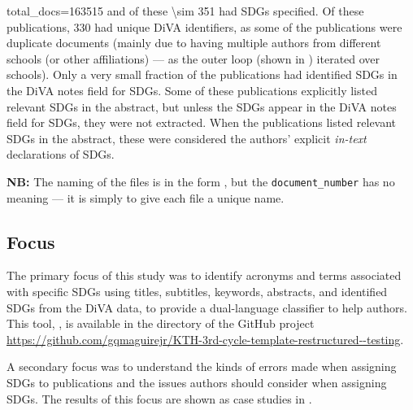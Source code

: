 \begin{takeaway}
total\_docs=\num{163515} and of these \num{\sim 351} had \glspl{SDG} specified. Of these publications, \num{330} had unique \gls{DiVA} identifiers, as some of the publications were duplicate documents (mainly due to having multiple authors from different schools (or other affiliations) --- as the outer loop (shown in ) iterated over schools). Only a very small fraction of the publications had identified \glspl{SDG} in the \gls{DiVA} notes field for \glspl{SDG}. Some of these publications explicitly listed relevant \glspl{SDG} in the abstract, but unless the \glspl{SDG} appear in the \gls{DiVA} notes field for \glspl{SDG}, they were not extracted. When the publications listed relevant \glspl{SDG} in the abstract, these were considered the authors' explicit \textit{in-text} declarations of \glspl{SDG}.
\end{takeaway}

\textbf{NB:} The naming of the files is in the form , but the \texttt{document\_number} has no meaning --- it is simply to give each file a unique name.

\subsection{Focus}
\label{sec:focus}

The primary focus of this study was to identify acronyms and terms associated with specific \glspl{SDG} using titles, subtitles, keywords, abstracts, and identified \glspl{SDG} from the \gls{DiVA} data, to provide a dual-language classifier to help authors. This tool, , is available in the  directory of the GitHub project \url{https://github.com/gqmaguirejr/KTH-3rd-cycle-template-restructured--testing}.

A secondary focus was to understand the kinds of errors made when assigning \glspl{SDG} to publications and the issues authors should consider when assigning \glspl{SDG}. The results of this focus are shown as case studies in .

